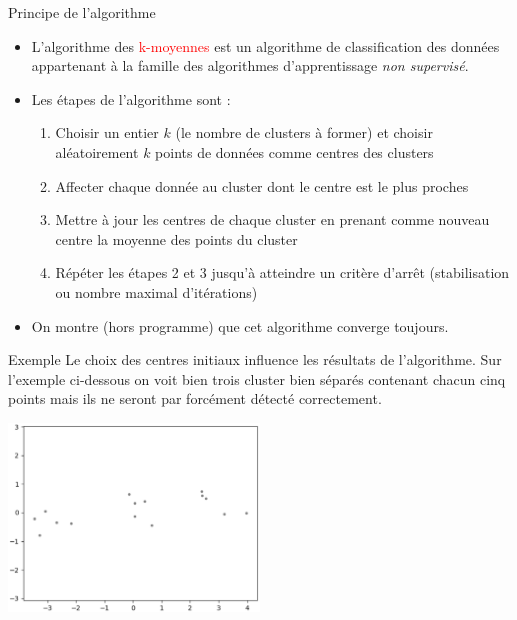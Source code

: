 \documentclass[10pt]{beamer}
\begin{document}
\begin{frame}{\Ctitle}{\stitle}
    \begin{alertblock}{Principe de l'algorithme}
        \begin{itemize}
            \item<1-> L'algorithme des \textcolor{red}{k-moyennes} est un algorithme de classification des données appartenant à la famille des algorithmes d'apprentissage \textit{non supervisé}.
            \item<2-> Les étapes de l'algorithme sont :
            \begin{enumerate}
                \item<3-> Choisir un entier $k$ (le nombre de clusters à former) et choisir aléatoirement $k$ points de données comme centres des clusters
                \item<4-> Affecter chaque donnée au cluster dont le centre est le plus proches
                \item<5-> Mettre à jour les centres de chaque cluster en prenant comme nouveau centre la moyenne des points du cluster
                \item<6-> Répéter les étapes 2 et 3 jusqu'à atteindre un critère d'arrêt (stabilisation ou nombre maximal d'itérations)
            \end{enumerate}
            \item<7-> On montre (hors programme) que cet algorithme converge toujours.
        \end{itemize}
    \end{alertblock}
\end{frame}

\begin{frame}{\Ctitle}{\stitle}
    \begin{exampleblock}{Exemple}
        Le choix des centres initiaux influence les résultats de l'algorithme. Sur l'exemple ci-dessous on \og{} voit \fg{} bien trois cluster bien séparés contenant chacun cinq points mais ils ne seront par forcément détecté correctement.
        \begin{center}
            \includegraphics[height=5cm]{start_simple.eps}
        \end{center}
    \end{exampleblock}
\end{frame}
\end{document}
